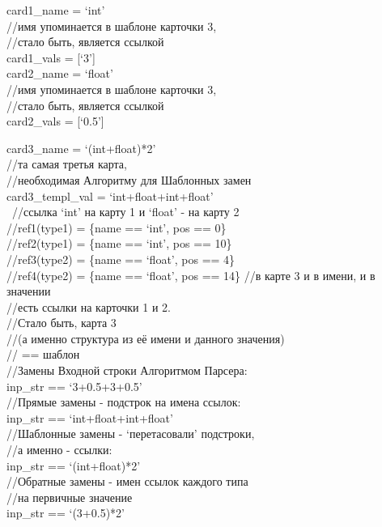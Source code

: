 \documentclass{book}
\begin{document}
\begin{tcolorbox}[breakable]
card1\_name = `int' \\
//имя упоминается в шаблоне карточки 3, \\ 
//стало быть, является ссылкой \\
card1\_vals = [`3'] \\

card2\_name = `float' \\
//имя упоминается в шаблоне карточки 3, \\ 
//стало быть, является ссылкой \\
card2\_vals = [`0.5']

card3\_name = `(int+float)*2' \\
//та самая третья карта, \\
//необходимая Алгоритму для Шаблонных замен \\
card3\_templ\_val = `int+float+int+float' \\\
//ссылка `int' на карту 1 и `float' - на карту 2 \\
//ref1(type1) = \{name == `int', pos == 0\} \\
//ref2(type1) = \{name == `int', pos == 10\} \\
//ref3(type2) = \{name == `float', pos == 4\} \\
//ref4(type2) = \{name == `float', pos == 14\}
//в карте 3 и в имени, и в значении \\
//есть ссылки на карточки 1 и 2. \\
//Стало быть, карта 3 \\
//(а именно структура из её имени и данного значения) \\
// == шаблон \\

//Замены Входной строки Алгоритмом Парсера: \\
inp\_str == `3+0.5+3+0.5' \\

//Прямые замены - подстрок на имена ссылок: \\
inp\_str == `int+float+int+float' \\

//Шаблонные замены - `перетасовали' подстроки, \\
//а именно - ссылки: \\
inp\_str == `(int+float)*2' \\

//Обратные замены - имен ссылок каждого типа \\
//на первичные значение \\
inp\_str == `(3+0.5)*2'
\end{tcolorbox}
\end{document}
